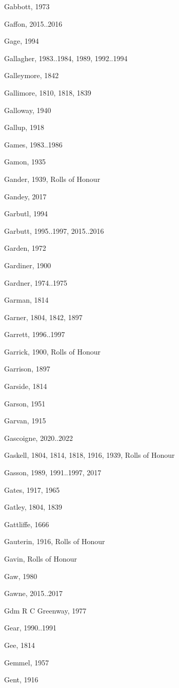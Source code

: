 \begin{theindex}
\item Gabbott, 1973
\item Gaffon, 2015..2016
\item Gage, 1994
\item Gallagher, 1983..1984, 1989, 1992..1994
\item Galleymore, 1842
\item Gallimore, 1810, 1818, 1839
\item Galloway, 1940
\item Gallup, 1918
\item Games, 1983..1986
\item Gamon, 1935
\item Gander, 1939, Rolls of Honour
\item Gandey, 2017
\item Garbutl, 1994
\item Garbutt, 1995..1997, 2015..2016
\item Garden, 1972
\item Gardiner, 1900
\item Gardner, 1974..1975
\item Garman, 1814
\item Garner, 1804, 1842, 1897
\item Garrett, 1996..1997
\item Garrick, 1900, Rolls of Honour
\item Garrison, 1897
\item Garside, 1814
\item Garson, 1951
\item Garvan, 1915
\item Gascoigne, 2020..2022
\item Gaskell, 1804, 1814, 1818, 1916, 1939, Rolls of Honour
\item Gasson, 1989, 1991..1997, 2017
\item Gates, 1917, 1965
\item Gatley, 1804, 1839
\item Gattliffe, 1666
\item Gauterin, 1916, Rolls of Honour
\item Gavin, Rolls of Honour
\item Gaw, 1980
\item Gawne, 2015..2017
\item Gdm R C Greenway, 1977
\item Gear, 1990..1991
\item Gee, 1814
\item Gemmel, 1957
\item Gent, 1916

\end{theindex}
